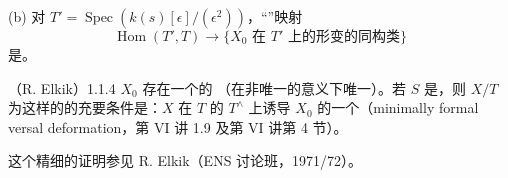 (b) 对 $T'=\operatorname{Spec}(k(s)[\epsilon]/(\epsilon^2))$，“”映射
\[
\operatorname{Hom}(T',T)\longrightarrow
\{X_0\text{ 在 }T'\text{ 上的形变的同构类}\}
\]
是。
\begin{SGAresult}{（R. Elkik）}{1.1.4}
$X_0$ 存在一个的 （在非唯一的意义下唯一）。若 $S$ 是，则 $X/T$ 为这样的的充要条件是：$X$ 在 $T$ 的 $T^\wedge$ 上诱导 $X_0$ 的一个（minimally formal versal deformation，第 VI 讲 1.9 及第 VI 讲第 4 节）。
\end{SGAresult}
这个精细的证明参见 R. Elkik（ENS 讨论班，1971/72）。

